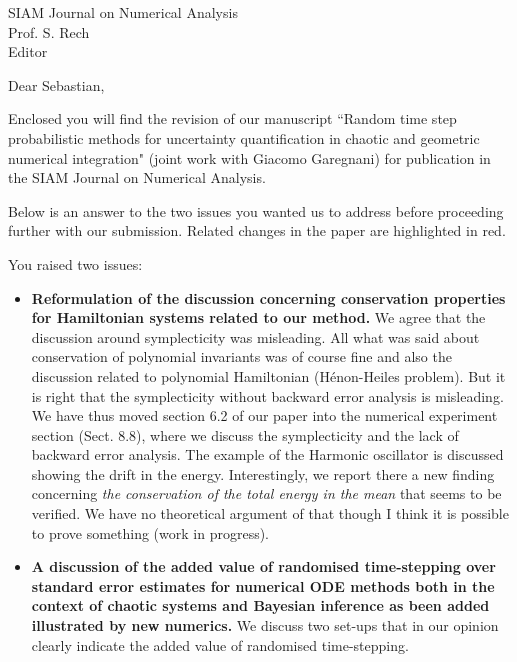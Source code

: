 \documentclass[10pt]{letter}
\begin{document}
\begin{letter}{SIAM Journal on Numerical Analysis\\
               Prof. S. Rech\\
	   Editor\\
\vspace{0,5cm}
}

\date{22 January 2018}

\vspace{6.0cm}
\opening{Dear Sebastian,}

\vspace{0.5cm}

Enclosed you will find the revision of our manuscript  ``Random time step probabilistic methods for uncertainty quantification in chaotic and geometric numerical integration" (joint work with Giacomo Garegnani) for publication in the SIAM Journal on Numerical Analysis. 

Below is an answer to the two issues you wanted us to address before proceeding further with our submission. Related changes in the paper  are highlighted in red.

You raised two issues:
\begin{itemize}
 \setcounter{enumi}{1}
	\item {\bf Reformulation of the discussion concerning conservation properties for Hamiltonian systems related to our method.}
We agree that the discussion around symplecticity was misleading. All what was said about conservation of polynomial invariants was of course fine and also the discussion related to polynomial Hamiltonian (H\'enon-Heiles problem). But it is right that the symplecticity without backward error analysis is misleading. We have thus moved section 6.2 of our paper into the numerical experiment section (Sect. 8.8), where we discuss the symplecticity and the lack of backward error analysis. The example of the Harmonic oscillator is discussed showing the drift in the energy. Interestingly, we report there a new finding concerning {\it the conservation of the total energy in the mean} that seems to be {\color{red} verified}. We have no theoretical argument of that though I think it is possible to prove something (work in progress).
	\item {\bf  A discussion of the  added value of randomised time-stepping over standard error estimates for numerical ODE methods both in the context of chaotic systems and Bayesian inference as been added illustrated by new numerics.}
We discuss two set-ups that in our opinion clearly indicate the added value of randomised time-stepping. 


\end{itemize}
\end{letter}
\end{document}
